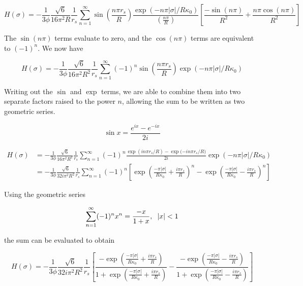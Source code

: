\documentclass[onecolumn]{aastex63}
\begin{document}
\begin{equation}
    H(\sigma) = - \frac{1}{3 \phi} \frac{\sqrt{6}}{16 \pi^2 R} \frac{1}{r_s} \sum_{n=1}^{\infty} \sin{\left(\frac{n\pi r_s}{R}\right)} \frac{\exp{(-n \pi |\sigma|/R\kappa_0)}}{\left(\frac{n\pi}{R}\right)} \left[ \frac{-\sin(n \pi)}{R^2} + \frac{n \pi \cos(n \pi)}{R^2}\right]
\end{equation}

The $\sin(n\pi)$ terms evaluate to zero, and the $\cos(n\pi)$ terms are equivalent to $(-1)^n$. We now have

\begin{equation}
    H(\sigma) = - \frac{1}{3 \phi} \frac{\sqrt{6}}{16 \pi^2 R^2} \frac{1}{r_s} \sum_{n=1}^{\infty} (-1)^n \sin{\left(\frac{n\pi r_s}{R}\right)} \exp{(-n \pi |\sigma|/R\kappa_0)}
\end{equation}

Writing out the $\sin$ and $\exp$ terms, we are able to combine them into two separate factors raised to the power $n$, allowing the sum to be written as two geometric series.

\begin{equation}
    \sin{x} = \frac{e^{ix}-e^{-ix}}{2i}
\end{equation}

\begin{equation}
    \begin{split}
        H(\sigma) &= - \frac{1}{3 \phi} \frac{\sqrt{6}}{16 \pi^2 R^2} \frac{1}{r_s} \sum_{n=1}^{\infty} (-1)^n \frac{\exp{(in\pi r_s / R)}-\exp{(-in\pi r_s/R})}{2i} \exp{(-n \pi |\sigma|/R\kappa_0)} \\
        &= - \frac{1}{3 \phi} \frac{\sqrt{6}}{32 i \pi^2 R^2} \frac{1}{r_s} \sum_{n=1}^{\infty} (-1)^n \left[ \exp{\left(\frac{-\pi |\sigma|}{R\kappa_0} + \frac{i\pi r_s}{R}\right)^n}-\exp{\left(\frac{-\pi |\sigma|}{R\kappa_0} - \frac{i\pi r_s}{R}\right)^n}\right]
    \end{split}
\end{equation}

Using the geometric series

\begin{equation}
    \sum_{n=1}^{\infty}(-1)^nx^n = \frac{-x}{1+x}, \hspace{0.2cm} |x| < 1
\end{equation}

the sum can be evaluated to obtain

\begin{equation}
    H(\sigma) = - \frac{1}{3 \phi} \frac{\sqrt{6}}{32 i \pi^2 R^2} \frac{1}{r_s} \left[\frac{-\exp{\left(\frac{-\pi |\sigma|}{R\kappa_0} + \frac{i\pi r_s}{R}\right)}}{1 + \exp{\left(\frac{-\pi |\sigma|}{R\kappa_0} + \frac{i\pi r_s}{R}\right)}}-\frac{-\exp{\left(\frac{-\pi |\sigma|}{R\kappa_0} - \frac{i\pi r_s}{R}\right)}}{1 + \exp{\left(\frac{-\pi |\sigma|}{R\kappa_0} - \frac{i\pi r_s}{R}\right)}}\right]
\end{equation}
\end{document}
